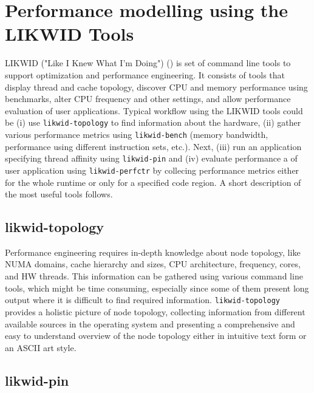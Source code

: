 \section{Performance modelling using the LIKWID Tools}
\label{sec:likwid}

LIKWID ("Like I Knew What I'm Doing") (\cite{likwid-2010-arxiv}) is set of command line tools to support optimization and performance engineering.
It consists of tools that display thread and cache topology, discover CPU and memory performance using benchmarks, alter CPU frequency and other settings, and allow performance evaluation of user applications.
Typical workflow using the LIKWID tools could be (i) use \texttt{likwid-topology} to find information about the hardware, (ii) gather various performance metrics using \texttt{likwid-bench} (memory bandwidth, performance using different instruction sets, etc.). Next, (iii) run an application specifying thread affinity using \texttt{likwid-pin} and (iv) evaluate performance a of user application using \texttt{likwid-perfctr} by collecing performance metrics either for the whole runtime or only for a specified code region.
A short description of the most useful tools follows.

\subsection*{likwid-topology}

Performance engineering requires  in-depth knowledge about node topology, like NUMA domains, cache hierarchy and sizes, CPU architecture, frequency, cores, and HW threads.
This information can be gathered using various command line tools, which might be time consuming, especially since some of them present long output where it is difficult to find required information. \texttt{likwid-topology} provides a holistic picture of node topology, collecting information from different available sources in the operating system and presenting a comprehensive and easy to understand overview of the node topology either in intuitive text form or an ASCII art style.

\subsection*{likwid-pin}

